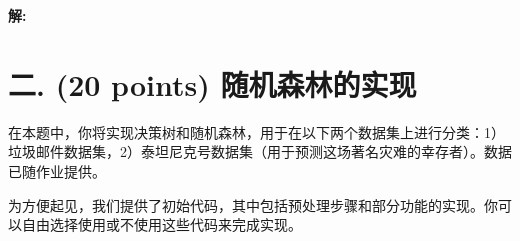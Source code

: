 \documentclass[8pt]{article}
\begin{document}
\textbf{\large 解:}

\vspace{3em}

    





\section*{二. (20 points) 随机森林的实现}

在本题中，你将实现决策树和随机森林，用于在以下两个数据集上进行分类：1）垃圾邮件数据集，2）泰坦尼克号数据集（用于预测这场著名灾难的幸存者）。数据已随作业提供。

为方便起见，我们提供了初始代码，其中包括预处理步骤和部分功能的实现。你可以自由选择使用或不使用这些代码来完成实现。
\end{document}
